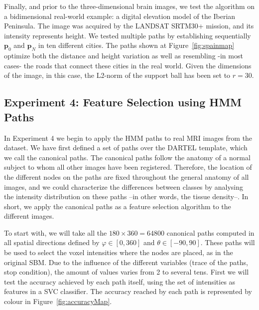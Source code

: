 Finally, and prior to the three-dimensional brain images, we test the algorithm on a bidimensional real-world example: a digital elevation model of the Iberian Peninsula. The image was acquired by the LANDSAT SRTM30+ mission, and its intensity represents height. We tested multiple paths by establishing sequentially $\mathbf{p}_0$ and $\mathbf{p}_N$ in ten different cities. The paths shown at Figure~\ref{fig:spainmap} optimize both the distance and height variation as well as resembling -in most cases- the roads that connect these cities in the real world. Given the dimensions of the image, in this case, the L2-norm of the support ball has been set to $r=30$. 


\subsection{Experiment 4: Feature Selection using \acs{HMM} Paths}
In Experiment 4 we begin to apply the \ac{HMM} paths to real \ac{MRI} images from the \adnimri{} dataset. We have first defined a set of paths over the DARTEL template, which we call the canonical paths. The canonical paths follow the anatomy of a normal subject to whom all other images have been registered. Therefore, the location of the different nodes on the paths are fixed throughout the general anatomy of all images, and we could characterize the differences between classes by analysing the intensity distribution on these paths --in other words, the tissue density--. In short, we apply the canonical paths as a feature selection algorithm to the different images. 

To start with, we will take all the $180\times360=64800$ canonical paths computed in all  spatial directions defined by $\varphi\in[0,360]$ and $\theta\in[-90,90]$. These paths will be used to select the voxel intensities where the nodes are placed, as in the original \ac{SBM}. Due to the influence of the different variables (trace of the paths, stop condition), the amount of values varies from 2 to several tens. First we will test the accuracy achieved by each path itself, using the set of intensities as features in a \ac{SVC} classifier. The accuracy reached by each path is represented by colour in Figure~\ref{fig:accuracyMap}. 

